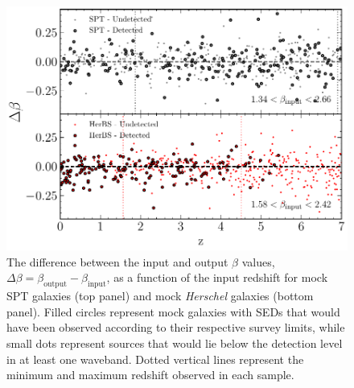 \begin{figure}
	\centering
	\includegraphics[width=0.75\columnwidth]{figures/beta_simulations.pdf}
	\caption{The difference between the input and output $\beta$ values, $\Delta \beta = \beta_{\textrm{output}} - \beta_{\textrm{input}}$, as a function of the input redshift for mock SPT galaxies (top panel) and mock \textit{Herschel} galaxies (bottom panel). Filled circles represent mock galaxies with SEDs that would have been observed according to their respective survey limits, while small dots represent sources that would lie below the detection level in at least one waveband. Dotted vertical lines represent the minimum and maximum redshift observed in each sample.}
	\label{fig:beta_z_simulation}
\end{figure}


